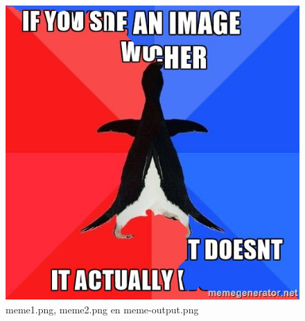 \documentclass{article}
\begin{document}
\begin{figure}[h!]
\includegraphics[scale=0.2]{../myexamples/meme-output.png}
\caption{meme1.png, meme2.png en meme-output.png}
\label{fig:Meme}
\end{figure}
\end{document}
